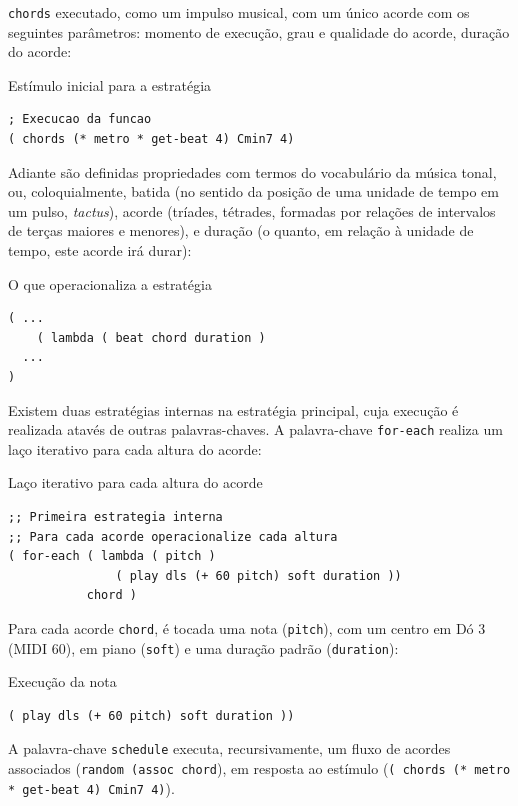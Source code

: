 \verb|chords| executado, como um impulso musical, com um único acorde com os seguintes parâmetros: momento de execução, grau e qualidade do acorde, duração do acorde:

\begin{example}{Estímulo inicial para a estratégia}
\begin{verbatim}
; Execucao da funcao
( chords (* metro * get-beat 4) Cmin7 4)
\end{verbatim}
\end{example}


Adiante são definidas propriedades com termos do vocabulário da música tonal, ou, coloquialmente, batida (no sentido da posição de uma unidade de tempo em um pulso, \emph{tactus}), acorde (tríades, tétrades, formadas por relações de intervalos de terças maiores e menores), e duração (o quanto, em relação à unidade de tempo, este acorde irá durar):

\begin{example}{O que operacionaliza a estratégia}
\begin{verbatim}
( ...
    ( lambda ( beat chord duration )
  ...
)    
\end{verbatim}
\end{example}

Existem duas estratégias internas na estratégia principal, cuja execução é realizada atavés de outras palavras-chaves. A palavra-chave \verb|for-each| realiza um laço iterativo para cada altura do acorde:

\begin{example}{Laço iterativo para cada altura do acorde}
\begin{verbatim}
;; Primeira estrategia interna 
;; Para cada acorde operacionalize cada altura
( for-each ( lambda ( pitch )
               ( play dls (+ 60 pitch) soft duration ))
           chord )
\end{verbatim}
\end{example}

Para cada acorde \verb|chord|, é tocada uma nota (\verb|pitch|), com um centro em Dó 3 (MIDI 60), em piano (\verb|soft|) e uma duração padrão (\verb|duration|):

\begin{example}{Execução da nota}
\begin{verbatim}
( play dls (+ 60 pitch) soft duration ))
\end{verbatim}
\end{example}
A palavra-chave \verb|schedule| executa, recursivamente, um fluxo de acordes associados (\verb|random (assoc chord|), em resposta ao estímulo (\verb|( chords (* metro * get-beat 4) Cmin7 4)|). 

